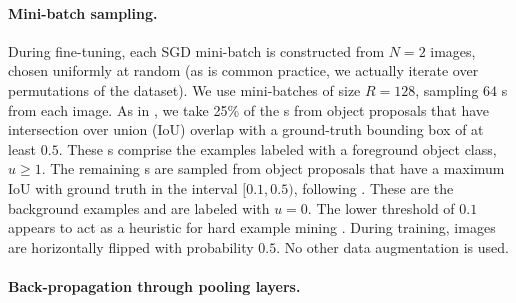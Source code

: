 \paragraph{Mini-batch sampling.}
During fine-tuning, each SGD mini-batch is constructed from $N = 2$ images, chosen uniformly at random (as is common practice, we actually iterate over permutations of the dataset).
We use mini-batches of size $R = 128$, sampling $64$ {\roi}s from each image.
As in \cite{girshick2014rcnn}, we take 25\% of the {\roi}s from object proposals that have intersection over union (IoU) overlap with a ground-truth bounding box of at least $0.5$.
These {\roi}s comprise the examples labeled with a foreground object class, \ie $u \ge 1$.
The remaining {\roi}s are sampled from object proposals that have a maximum IoU with ground truth in the interval $[0.1, 0.5)$, following \cite{he2014spp}.
These are the background examples and are labeled with $u = 0$.
The lower threshold of $0.1$ appears to act as a heuristic for hard example mining \cite{lsvm-pami}.
During training, images are horizontally flipped with probability $0.5$.
No other data augmentation is used.%

\paragraph{Back-propagation through \roi pooling layers.}


